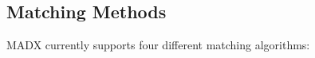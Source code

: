 




\subsection{Matching Methods}

 MADX currently supports four different matching algorithms: 


